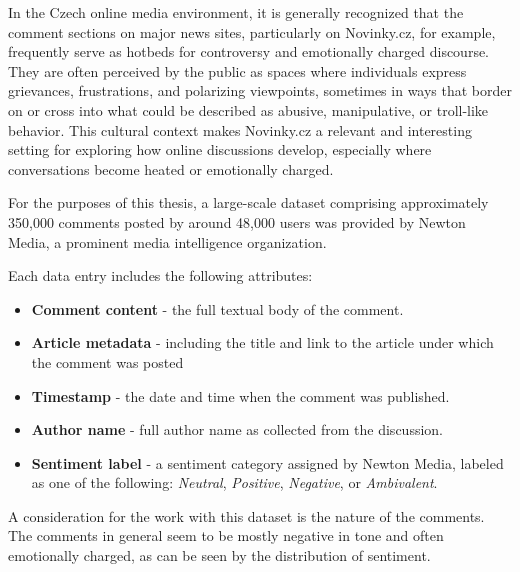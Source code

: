 \documentclass[twoside]{ctuthesis}
\theoremstyle{plain}
\theoremstyle{definition}
\theoremstyle{note}
\begin{document}
In the Czech online media environment, it is generally recognized that the comment sections on major news sites, particularly on Novinky.cz, for example, frequently serve as hotbeds for controversy and emotionally charged discourse. They are often perceived by the public as spaces where individuals express grievances, frustrations, and polarizing viewpoints, sometimes in ways that border on or cross into what could be described as abusive, manipulative, or troll-like behavior. This cultural context makes Novinky.cz a relevant and interesting setting for exploring how online discussions develop, especially where conversations become heated or emotionally charged.\par

For the purposes of this thesis, a large-scale dataset comprising approximately 350,000 comments posted by around 48,000 users was provided by Newton Media, a prominent media intelligence organization.\par 

Each data entry includes the following attributes:
\begin{itemize}
  \item \textbf{Comment content} - the full textual body of the comment.
  
  \item \textbf{Article metadata} - including the title and link to the article under which the comment was posted
  
  \item \textbf{Timestamp} - the date and time when the comment was published.
  
  \item \textbf{Author name} - full author name as collected from the discussion.
  
  \item \textbf{Sentiment label} - a sentiment category assigned by Newton Media, labeled as one of the following: \textit{Neutral}, \textit{Positive}, \textit{Negative}, or \textit{Ambivalent}.
\end{itemize}

A consideration for the work with this dataset is the nature of the comments. The comments in general seem to be mostly negative in tone and often emotionally charged, as can be seen by the distribution of sentiment.
\end{document}
